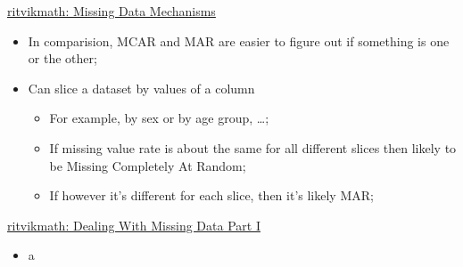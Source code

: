 \documentclass[12pt, titlepage, french]{report}
\begin{document}
\begin{YTB_SUMM_AUTO_NUMB}[label = {rvm-MCAR-etal}]{\href{https://www.youtube.com/watch?v=XnnA9z7lv4Q}{ritvikmath: Missing Data Mechanisms
}}
\begin{itemize}[leftmargin = *]
\begin{itemize}
		\end{itemize}
	\begin{itemize}
	\item	In comparision, MCAR and MAR are easier to figure out if something is one or the other;
	\item	Can slice a dataset by values of a column
		\begin{itemize}
		\item	For example, by sex or by age group, \dots;
		\item	If missing value rate is about the same for all different slices then likely to be Missing Completely At Random;
		\item	If however it's different for each slice, then it's likely MAR;
		\end{itemize}
	\end{itemize}
\end{itemize}
\end{YTB_SUMM_AUTO_NUMB}

\begin{YTB_SUMM_AUTO_NUMB}[label = {rvm-MCAR-etal-deal}]{\href{https://www.youtube.com/watch?v=qIXHLZJJ42U}{ritvikmath: Dealing With Missing Data Part I}}
\begin{itemize}[leftmargin = *]
	\item	a
\end{itemize}
\end{YTB_SUMM_AUTO_NUMB}
\end{document}
